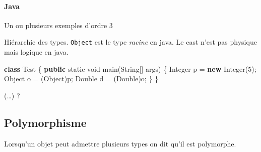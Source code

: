 \documentclass[]{article}
\newenvironment{Shaded}{}{}
\newcommand{\KeywordTok}[1]{\textcolor[rgb]{0.00,0.44,0.13}{\textbf{#1}}}
\newcommand{\DataTypeTok}[1]{\textcolor[rgb]{0.56,0.13,0.00}{#1}}
\newcommand{\DecValTok}[1]{\textcolor[rgb]{0.25,0.63,0.44}{#1}}
\newcommand{\SpecialCharTok}[1]{\textcolor[rgb]{0.25,0.44,0.63}{#1}}
\newcommand{\StringTok}[1]{\textcolor[rgb]{0.25,0.44,0.63}{#1}}
\newcommand{\ImportTok}[1]{#1}
\newcommand{\CommentTok}[1]{\textcolor[rgb]{0.38,0.63,0.69}{\textit{#1}}}
\newcommand{\FunctionTok}[1]{\textcolor[rgb]{0.02,0.16,0.49}{#1}}
\newcommand{\ControlFlowTok}[1]{\textcolor[rgb]{0.00,0.44,0.13}{\textbf{#1}}}
\newcommand{\BuiltInTok}[1]{#1}
\newcommand{\PreprocessorTok}[1]{\textcolor[rgb]{0.74,0.48,0.00}{#1}}
\newcommand{\NormalTok}[1]{#1}
\let\oldparagraph\paragraph
\renewcommand{\paragraph}[1]{\oldparagraph{#1}\mbox{}}
\begin{document}
\begin{Shaded}
\end{Shaded}

\paragraph{Java}\label{java}

Un ou plusieurs exemples d'ordre 3

Hiérarchie des types. \texttt{Object} est le type \emph{racine} en java.
Le cast n'est pas physique mais logique en java.

\begin{Shaded}
\begin{Highlighting}[]
\KeywordTok{class}\NormalTok{ Test \{}
    \KeywordTok{public} \DataTypeTok{static} \DataTypeTok{void} \FunctionTok{main}\NormalTok{(}\BuiltInTok{String}\NormalTok{[] args) \{}
        \BuiltInTok{Integer}\NormalTok{ p = }\KeywordTok{new} \BuiltInTok{Integer}\NormalTok{(}\DecValTok{5}\NormalTok{);}
        \BuiltInTok{Object}\NormalTok{ o = (}\BuiltInTok{Object}\NormalTok{)p;}
        \BuiltInTok{Double}\NormalTok{ d = (}\BuiltInTok{Double}\NormalTok{)o;}
\NormalTok{    \}}
\NormalTok{\}}
\end{Highlighting}
\end{Shaded}

(\ldots{}) ?

\subsection{Polymorphisme}\label{polymorphisme}

Lorsqu'un objet peut admettre plusieurs types on dit qu'il est
polymorphe.
\end{document}
